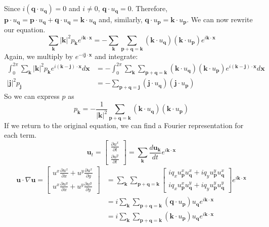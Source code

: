 \documentclass[12pt]{article}
\begin{document}
Since $i(\mathbf{q}\cdot{u}_\mathbf{q})=0$ and $i\neq0$, $\mathbf{q}\cdot{u}_\mathbf{q}=0$. Therefore,  $\mathbf{p}\cdot{u}_\mathbf{q}=\mathbf{p}\cdot{u}_\mathbf{q}+\mathbf{q}\cdot{u}_\mathbf{q}=\mathbf{k}\cdot{u}_\mathbf{q}$ and, similarly, $\mathbf{q}\cdot{u}_\mathbf{p}=\mathbf{k}\cdot{u}_\mathbf{p}$. We can now rewrite our equation.
\[
\sum_\mathbf{k}|\mathbf{k}|^2p_\mathbf{k}e^{i\mathbf{k\cdot{x}}}=-\sum_\mathbf{k}\sum_\mathbf{p+q=k}(\mathbf{k}\cdot{u}_\mathbf{q})(\mathbf{k}\cdot{u}_\mathbf{p})e^{i\mathbf{k\cdot{x}}}
\]
Again, we multiply by $e^{-i\mathbf{j\cdot{x}}}$ and integrate:
\begin{align*}
\int^{2\pi}_0\sum_\mathbf{k}|\mathbf{k}|^2p_\mathbf{k}e^{i(\mathbf{k-j})\cdot\mathbf{x}}d\mathbf{x} &=-\int^{2\pi}_0\sum_\mathbf{k}\sum_\mathbf{p+q=k}(\mathbf{k}\cdot{u}_\mathbf{q})(\mathbf{k}\cdot{u}_\mathbf{p})e^{i(\mathbf{k-j})\cdot\mathbf{x}}d\mathbf{x}\\
|\mathbf{j}|^2p_\mathbf{j}&=-\sum_\mathbf{p+q=j}(\mathbf{j}\cdot{u}_\mathbf{q})(\mathbf{j}\cdot{u}_\mathbf{p})
\end{align*}
So we can express $p$ as
\[
p_\mathbf{k}=-\frac{1}{|\mathbf{k}|^2}\sum_\mathbf{p+q=k}(\mathbf{k}\cdot{u}_\mathbf{q})(\mathbf{k}\cdot{u}_\mathbf{p})
\]
If we return to the original equation, we can find a Fourier representation for each term.
\[
\mathbf{u}_t =\begin{bmatrix}\frac{\partial{u^x}}{\partial{t}}\\\frac{\partial{u^y}}{\partial{t}}\end{bmatrix}=\sum_\mathbf{k}\frac{d\mathbf{u_k}}{dt}e^{i\mathbf{k\cdot{x}}}
\]
\begin{align*}
\mathbf{u}\cdot\nabla\mathbf{u}=\begin{bmatrix}u^x\frac{\partial{u^x}}{\partial{x}}+u^y\frac{\partial{u^x}}{\partial{y}}\\u^x\frac{\partial{u^y}}{\partial{x}}+u^y\frac{\partial{u^y}}{\partial{y}}\end{bmatrix}&=\sum_\mathbf{k}\sum_\mathbf{p+q=k}\begin{bmatrix}iq_xu_\mathbf{p}^xu_\mathbf{q}^x+iq_yu_\mathbf{p}^yu_\mathbf{q}^x\\iq_xu_\mathbf{p}^xu_\mathbf{q}^y+iq_yu_\mathbf{p}^yu_\mathbf{q}^y\end{bmatrix}e^{i\mathbf{k\cdot{x}}}\\
&=i\sum_\mathbf{k}\sum_\mathbf{p+q=k}(\mathbf{q}\cdot{u}_\mathbf{p})u_\mathbf{q}e^{i\mathbf{k\cdot{x}}}\\
&=i\sum_\mathbf{k}\sum_\mathbf{p+q=k}(\mathbf{k}\cdot{u}_\mathbf{p})u_\mathbf{q}e^{i\mathbf{k\cdot{x}}}
\end{align*}
\end{document}
